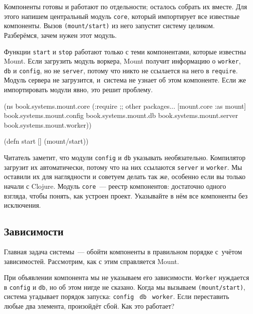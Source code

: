 
Компоненты готовы и работают по отдельности; осталось собрать их вместе. Для
этого напишем центральный модуль \verb|core|, который импортирует все известные
компоненты. Вызов \verb|(mount/start)| из него запустит систему
целиком. Разберёмся, зачем нужен этот модуль.

Функции \verb|start| и \verb|stop| работают только с теми компонентами, которые
известны Mount. Если загрузить модуль воркера, Mount получит информацию о
\verb|worker|, \verb|db| и \verb|config|, но не \verb|server|, потому что никто
не ссылается на него в \verb|require|. Модуль сервера не загрузится, и~система
не узнает об этом компоненте. Если же импортировать модули явно, это решит
проблему.

\label{mount-main}

\begin{english}
  \begin{clojure}
(ns book.systems.mount.core
  (:require
   ;; other packages...
   [mount.core :as mount]
   book.systems.mount.config
   book.systems.mount.db
   book.systems.mount.server
   book.systems.mount.worker))

(defn start []
  (mount/start))
  \end{clojure}
\end{english}

Читатель заметит, что модули \verb|config| и \verb|db| указывать
необязательно. Компилятор загрузит их автоматически, потому что на них ссылаются
\verb|server| и \verb|worker|. Мы оставили их для наглядности и советуем делать
так же, особенно если вы только начали с Clojure. Модуль \verb|core|~--- реестр
компонентов: достаточно одного взгляда, чтобы понять, как устроен
проект. Указывайте в нём все компоненты без исключения.

\subsection{Зависимости}


Главная задача системы~--- обойти компоненты в правильном порядке с~учётом
зависимостей. Рассмотрим, как с этим справляется Mount.

При объявлении компонента мы не указываем его зависимости. \verb|Worker|
нуждается в \verb|config| и \verb|db|, но об этом нигде не сказано. Когда мы
вызываем \verb|(mount/start)|, система угадывает порядок запуска:
\verb|config|~\arr{} \verb|db|~\arr{} \verb|worker|. Если переставить любые два
элемента, произойдёт сбой. Как это работает?

